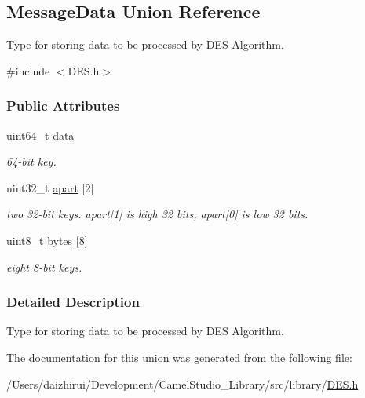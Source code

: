 \hypertarget{a00115}{}\subsection{Message\+Data Union Reference}
\label{a00115}


Type for storing data to be processed by D\+ES Algorithm.  




{\ttfamily \#include $<$D\+E\+S.\+h$>$}

\subsubsection*{Public Attributes}
\begin{DoxyCompactItemize}
\item 
\mbox{\label{a00115_a2cf9dd28d0679205048930fe98fa116b}} 
uint64\+\_\+t \mbox{\hyperlink{a00115_a2cf9dd28d0679205048930fe98fa116b}{data}}
\begin{DoxyCompactList}\small\item\em 64-\/bit key. \end{DoxyCompactList}\item 
\mbox{\label{a00115_a43406dd2e72f1230b8f70551a96699c5}} 
uint32\+\_\+t \mbox{\hyperlink{a00115_a43406dd2e72f1230b8f70551a96699c5}{apart}} \mbox{[}2\mbox{]}
\begin{DoxyCompactList}\small\item\em two 32-\/bit keys. apart\mbox{[}1\mbox{]} is high 32 bits, apart\mbox{[}0\mbox{]} is low 32 bits. \end{DoxyCompactList}\item 
\mbox{\label{a00115_aaceaebf6f0349dae52e2c1c2a462b654}} 
uint8\+\_\+t \mbox{\hyperlink{a00115_aaceaebf6f0349dae52e2c1c2a462b654}{bytes}} \mbox{[}8\mbox{]}
\begin{DoxyCompactList}\small\item\em eight 8-\/bit keys. \end{DoxyCompactList}\end{DoxyCompactItemize}


\subsubsection{Detailed Description}
Type for storing data to be processed by D\+ES Algorithm. 

The documentation for this union was generated from the following file\+:\begin{DoxyCompactItemize}
\item 
/\+Users/daizhirui/\+Development/\+Camel\+Studio\+\_\+\+Library/src/library/\mbox{\hyperlink{a00011}{D\+E\+S.\+h}}\end{DoxyCompactItemize}
